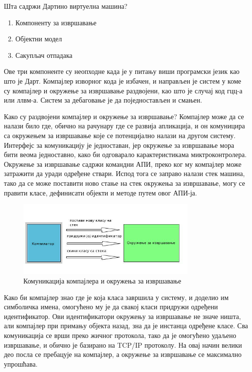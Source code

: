 \documentclass[12pt,oneside]{memoir}
\begin{document}
Шта садржи Дартино виртуелна машина?
\begin{enumerate}
\item Компоненту за извршавање
\item Објектни модел
\item Сакупљач отпадака
\end{enumerate}

Ове три компоненте су неопходне када је у питању виши програмски језик као што је Дарт. Компајлер изворног кода је избачен, и направљен је систем у коме су компајлер и окружење за извршавање раздвојени, као што је случај код гцц-а или ллвм-а. Систем за дебаговање је да поједностављен и смањен.

Како су раздвојени компајлер и окружење за извршавање? Компајлер може да се налази било где, обично на рачунару где се развија апликација, и он комуницира са окружењем за извршавање које се потенцијално налази на другом систему. Интерфејс за комуникацију је једноставан, јер окружење за извршавање мора бити веома једноставно, како би одговарало карактеристикама миктроконтролера.
Окружење за извршавање садржи командни АПИ, преко ког му компајлер може затражити да уради одређене ствари. Испод тога се заправо налази стек машина, тако да се може поставити ново стање на стек окружења за извршавање, могу се правити класе, дефинисати објекти и методе путем овог АПИ-ја.

\begin{figure}[!ht]
  \centering
  \includegraphics[width=0.8\textwidth]{compiler.jpg}
  \caption{Комуникација компајлера и окружења за извршавање}
  \label{fig:komunikacija}
\end{figure}

Како би компајлер знао где је која класа завршила у систему, и доделио им симболичка имена, омогућено му је да свакој класи придружи одређени идентификатор. Ови идентификатори окружењу за извршавање не значе ништа, али компајлер при примању објекта назад, зна да је инстанца одређене класе.
Сва комуникација се врши преко жичног протокола, тако да је омогућено удаљено извршавање, и обично је базирано на TCP/IP протоколу. На овај начин велики део посла се пребацује на компајлер, а окружење за извршавање се максимално упрошћава.
\end{document}
